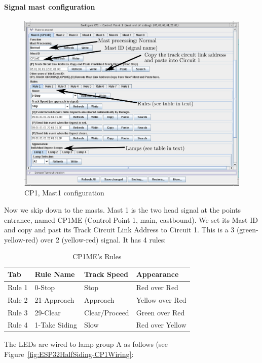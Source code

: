 \paragraph{Signal mast configuration}
\begin{figure}[hbpt]\begin{centering}%
\includegraphics[width=5in]{CP1-Mast1-Config-Annotated.png}
\caption{CP1, Mast1 configuration}
\label{fig:CP1-Mast1-Config}
\end{centering}\end{figure}
Now we skip down to the masts. Mast 1 is the two head signal at the points
entrance, named CP1ME (Control Point 1, main, eastbound). We set its Mast ID
and copy and past its Track Circuit Link Address to Circuit 1. This is a 3
(green-yellow-red) over 2 (yellow-red) signal. It has 4 rules:
\begin{table}[htdp]\begin{centering}\begin{tabular}{|l|l|l|l|}
\hline
Tab&Rule Name&Track Speed&Appearance\\
\hline
Rule 1&0-Stop&Stop&Red over Red\\
Rule 2&21-Approach&Approach&Yellow over Red\\
Rule 3&29-Clear&Clear/Proceed&Green over Red\\
Rule 4&1-Take Siding&Slow&Red over Yellow\\
\hline
\end{tabular}
\caption{CP1ME's Rules}
\label{tab:CP1MERules}
\end{centering}\end{table}
The LEDs are wired to lamp group A as follows (see Figure~\ref{fig:ESP32HalfSiding-CP1Wiring}: 
